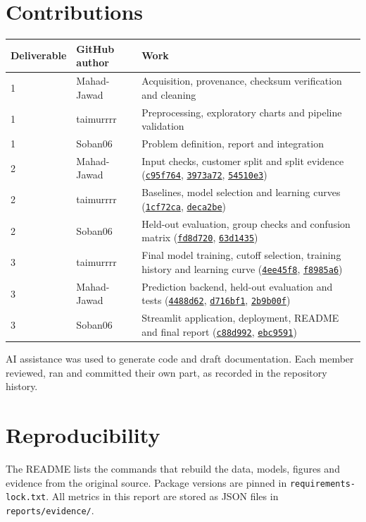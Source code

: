 \documentclass[11pt,a4paper]{article}
\newcommand{\commit}[1]{\href{https://github.com/Soban06/Reclaim/commit/#1}{\texttt{#1}}}
\begin{document}
\section{Contributions}
\begin{table}[H]\centering\small
\begin{tabularx}{\linewidth}{@{}llX@{}}
\toprule Deliverable & GitHub author & Work\\ \midrule
1 & Mahad-Jawad & Acquisition, provenance, checksum verification and cleaning\\
1 & taimurrrr & Preprocessing, exploratory charts and pipeline validation\\
1 & Soban06 & Problem definition, report and integration\\ \midrule
2 & Mahad-Jawad & Input checks, customer split and split evidence (\commit{c95f764}, \commit{3973a72}, \commit{54510e3})\\
2 & taimurrrr & Baselines, model selection and learning curves (\commit{1cf72ca}, \commit{deca2be})\\
2 & Soban06 & Held-out evaluation, group checks and confusion matrix (\commit{fd8d720}, \commit{63d1435})\\ \midrule
3 & taimurrrr & Final model training, cutoff selection, training history and learning curve (\commit{4ee45f8}, \commit{f8985a6})\\
3 & Mahad-Jawad & Prediction backend, held-out evaluation and tests (\commit{4488d62}, \commit{d716bf1}, \commit{2b9b00f})\\
3 & Soban06 & Streamlit application, deployment, README and final report (\commit{c88d992}, \commit{ebc9591})\\ \bottomrule
\end{tabularx}
\end{table}
AI assistance was used to generate code and draft documentation. Each member reviewed, ran and committed their own part, as recorded in the repository history.

\section*{Reproducibility}
The README lists the commands that rebuild the data, models, figures and evidence from the original source. Package versions are pinned in \texttt{requirements-lock.txt}. All metrics in this report are stored as JSON files in \texttt{reports/evidence/}.
\end{document}

